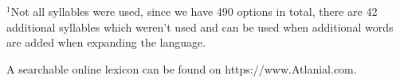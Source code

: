 $^1${\normalsize \noindent Not all syllables were used, since we have 490 options in total, there are 42 additional syllables which weren't used and can be used when additional words are added when expanding the language.}

A searchable online lexicon can be found on https://www.Atlanial.com.

\endgroup
\vfill
\restoregeometry
\setlength{\footskip}{60pt}
